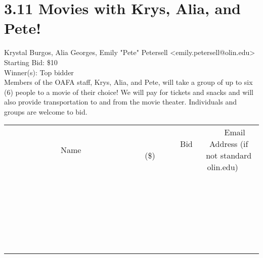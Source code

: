 \documentclass[11pt]{article}
\begin{document}
					\section*{3.11 Movies with Krys, Alia, and Pete!}
					Krystal Burgos, Alia Georges, Emily "Pete" Petersell <emily.petersell@olin.edu> \\
					Starting Bid: \$10 \\
					Winner(s): Top bidder \\
					Members of the OAFA staff, Krys, Alia, and Pete, will take a group of up to six (6) people to a movie of their choice! We will pay for tickets and snacks and will also provide transportation to and from the movie theater. Individuals and groups are welcome to bid. \\
					[6ex]
					\begin{tabular}{c c c}
						~~~~~~~~~~~~~Name~~~~~~~~~~~~~ & ~~~~~~~~~Bid (\$)~~~~~~~~~ & ~~~Email Address (if not standard olin.edu)~~~ \\
				
 & & \\
\hline
 & & \\
\hline
 & & \\
\hline
 & & \\
\hline
 & & \\
\hline
 & & \\
\hline
 & & \\
\hline
 & & \\
\hline
 & & \\
\hline
 & & \\
\hline
 & & \\
\hline
 & & \\
\hline
 & & \\
\hline
 & & \\
\hline
 & & \\
\hline
 & & \\
\hline
 & & \\
\hline
 & & \\
\hline
 & & \\
\hline
 & & \\
\hline
 & & \\
\hline
 & & \\
\hline
 & & \\
\hline
 & & \\
\hline
 & & \\
\hline
 & & \\
\hline
					\end{tabular}
					\clearpage
				
\end{document}
